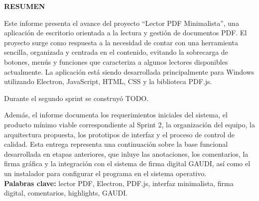 \begin{center}
\thispagestyle{empty}
\vspace{2cm}
\LARGE{\textbf{RESUMEN}}\\[1.0cm]
\end{center}
\thispagestyle{empty}

Este informe presenta el avance del proyecto “Lector PDF Minimalista”, una aplicación de escritorio orientada a la lectura y gestión de documentos PDF. El proyecto surge como respuesta a la necesidad de contar con una herramienta sencilla, organizada y centrada en el contenido, evitando la sobrecarga de botones, menús y funciones que caracteriza a algunos lectores disponibles actualmente. La aplicación está siendo desarrollada principalmente para Windows utilizando Electron, JavaScript, HTML, CSS y la biblioteca PDF.js.

Durante el segundo sprint se construyó TODO.

Además, el informe documenta los requerimientos iniciales del sistema, el producto mínimo viable correspondiente al Sprint 2, la organización del equipo, la arquitectura propuesta, los prototipos de interfaz y el proceso de control de calidad. Esta entrega representa una continuación sobre la base funcional desarrollada en etapas anteriores, que inluye las anotaciones, los comentarios, la firma gráfica y la integración con el sistema de firma digital GAUDI, así como el un instalador para configurar el programa en el sistema operativo. \\

\textbf{Palabras clave: }lector PDF, Electron, PDF.js, interfaz minimalista, firma digital, comentarios, highlights, GAUDI.